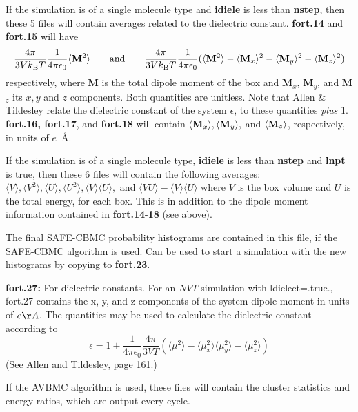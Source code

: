 \documentclass[12pt,letterpaper]{article}
\begin{document}
{{{{{{
If the simulation is of a single molecule type and {\bf idiele} is
less than {\bf nstep}, then these 5 files will contain averages
related to the dielectric constant. {\bf fort.14} and {\bf fort.15}
will have
$$
{{4\pi} \over {3Vk_{\rm B}T}} {1 \over 4\pi\epsilon_0} 
\langle {\bf M}^2\rangle 
\hskip 20pt {\rm and} \hskip 20pt
{{4\pi} \over {3Vk_{\rm B}T} }{1 \over 4\pi\epsilon_0} 
(\langle {\bf M}^2\rangle - 
\langle {\bf M}_x\rangle^2 - 
\langle{\bf M}_y\rangle^2 - 
\langle{\bf M}_z\rangle^2 )
$$ 
respectively, where {\bf M} is the total dipole moment of the box and
{\bf M}$_x$, {\bf M}$_y$, and {\bf M}$_z$ its $x, y$ and $z$
components.  Both quantities are unitless.  Note that Allen \&
Tildesley relate the dielectric constant of the system $\epsilon$, to
these quantities {\sl plus} 1.  {\bf fort.16, fort.17}, and {\bf
fort.18} will contain $\langle{\bf M}_x\rangle, \langle{\bf
M}_y\rangle,$ and $\langle{\bf M}_z\rangle$, respectively, in units of
$e$~{\AA}.

If the simulation is of a single molecule type, {\bf idiele} is less
than {\bf nstep} and {\bf lnpt} is true, then these 6 files will
contain the following averages: $\langle V\rangle, \langle V^2
\rangle, \langle U \rangle, \langle U^2\rangle, \langle V
\rangle\langle U \rangle,$ and $\langle VU \rangle - \langle V \rangle
\langle U \rangle$ where $V$ is the box volume and $U$ is the total
energy, for each box.  This is in addition to the dipole moment
information contained in {\bf fort.14}-{\bf 18} (see above).

The final SAFE-CBMC probability histograms are contained in this file,
if the SAFE-CBMC algorithm is used.  Can be used to start a simulation
with the new histograms by copying to {\bf fort.23}.

\noindent \textbf{fort.27:} For dielectric constants.
For an $NVT$ simulation with ldielect=.true., fort.27 contains the x, y, and z components
of the system dipole moment in units of $e \AA$.  The quantities may be used to calculate the 
dielectric constant according to
\begin{equation}
\epsilon = 1 + \frac{1}{4\pi\epsilon_0} \frac{4 \pi}{3VT} \left ( \langle \mu^2 \rangle - \langle \mu_x^2 \rangle
 \langle \mu_y^2 \rangle - \langle \mu_z^2 \rangle \right )
\end{equation}
(See Allen and Tildesley, page 161.)

If the AVBMC algorithm is used, these files will contain the cluster statistics and energy ratios,
which are output every cycle.

}}}}}}
\end{document}
